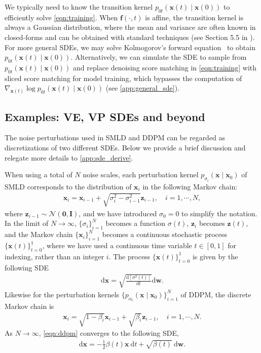\documentclass{article} \usepackage{iclr2021_conference,times}
\newcommand{\ud}{\mathrm{d}}
\newcommand{\mcal}{\mathcal}
\newcommand{\bfx}{\mathbf{x}}
\newcommand{\bfw}{\mathbf{w}}
\newcommand{\bfz}{\mathbf{z}}
\newcommand{\bfI}{\mathbf{I}}
\newcommand{\bff}{\mathbf{f}}
\newcommand{\bfzero}{\mathbf{0}}
\begin{document}
We typically need to know the transition kernel $p_{0t}(\bfx(t) \mid \bfx(0))$ to efficiently solve \cref{eqn:training}. When $\bff(\cdot, t)$ is affine, the transition kernel is always a Gaussian distribution, where the mean and variance are often known in closed-forms and can be obtained with standard techniques (see Section 5.5 in \citet{sarkka2019applied}). For more general SDEs, we may solve Kolmogorov's forward equation~\citep{oksendal2003stochastic} to obtain $p_{0t}(\bfx(t) \mid \bfx(0))$. Alternatively, we can simulate the SDE to sample from $p_{0t}(\bfx(t) \mid \bfx(0))$ and replace denoising score matching in \cref{eqn:training} with sliced score matching for model training, which bypasses the computation of $\nabla_{\bfx(t)} \log p_{0t}(\bfx(t) \mid \bfx(0))$ (see \cref{app:general_sde}).




\subsection{Examples: VE, VP SDEs and beyond}\label{sec:sde_examples}
The noise perturbations used in SMLD and DDPM can be regarded as discretizations of two different SDEs. Below we provide a brief discussion and relegate more details to \cref{app:sde_derive}.

When using a total of $N$ noise scales, each perturbation kernel $p_{\sigma_i}(\bfx \mid \bfx_0)$ of SMLD corresponds to the distribution of $\bfx_i$ in the following Markov chain:
\begin{align}
\bfx_i = \bfx_{i-1} + \sqrt{\sigma_{i}^2 - \sigma_{i-1}^2} \bfz_{i-1}, \quad i=1,\cdots,N \label{eqn:ncsn},
\end{align}
where $\bfz_{i-1} \sim \mcal{N}(\bfzero, \bfI)$, and we have introduced $\sigma_0 = 0$ to simplify the notation.
In the limit of $N \to \infty$, $\{\sigma_i\}_{i=1}^N$ becomes a function $\sigma(t)$, $\bfz_i$ becomes $\bfz(t)$, and the Markov chain $\{\bfx_i\}_{i=1}^N$ becomes a continuous stochastic process $\{\bfx(t)\}_{t=0}^1$, where we have used a continuous time variable $t \in [0, 1]$ for indexing, rather than an integer $i$. The process $\{\bfx(t)\}_{t=0}^1$ is given by the following SDE
\begin{align}
\ud \bfx = \sqrt{\frac{\ud \left[ \sigma^2(t) \right]}{\ud t}}\ud \bfw. \label{eqn:ncsn_sde}
\end{align}
Likewise for the perturbation kernels $\{p_{\alpha_i}(\bfx \mid \bfx_0)\}_{i=1}^N$ of DDPM, the discrete Markov chain is
\begin{align}
    \bfx_i = \sqrt{1-\beta_{i}} \bfx_{i-1} + \sqrt{\beta_{i}} \bfz_{i-1}, \quad i=1,\cdots,N. \label{eqn:ddpm}
\end{align}
As $N\to \infty$, \cref{eqn:ddpm} converges to the following SDE,
\begin{align}
\ud \bfx = -\frac{1}{2}\beta(t) \bfx~ \ud t + \sqrt{\beta(t)} ~\ud \bfw. \label{eqn:ddpm_sde}
\end{align}
\end{document}
